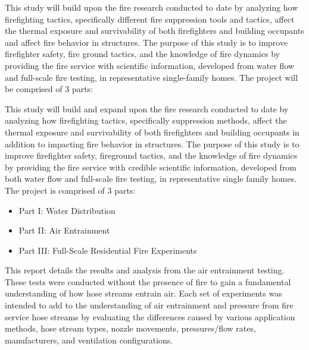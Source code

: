 \documentclass[12pt,oneside]{book}
\begin{document}
This study will build upon the fire research conducted to date by analyzing how firefighting tactics, specifically different fire suppression tools and tactics, affect the thermal exposure and survivability of both firefighters and building occupants and affect fire behavior in structures. The purpose of this study is to improve firefighter safety, fire ground tactics, and the knowledge of fire dynamics by providing the fire service with scientific information, developed from water flow and full-scale fire testing, in representative single-family homes. The project will be comprised of 3 parts:


\vspace*{\baselineskip}

This study will build and expand upon the fire research conducted to date by analyzing how firefighting tactics, specifically suppression methods, affect the thermal exposure and survivability of both firefighters and building occupants in addition to impacting fire behavior in structures. The purpose of this study is to improve firefighter safety, fireground tactics, and the knowledge of fire dynamics by providing the fire service with credible scientific information, developed from both water flow and full-scale fire testing, in representative single family homes. The project is comprised of 3 parts:
\vspace*{\baselineskip}
\begin{itemize}
	\item Part I:  Water Distribution
	\item Part II: Air Entrainment
	\item Part III: Full-Scale Residential Fire Experiments
	\end{itemize}
\vspace*{\baselineskip}

This report details the results and analysis from the air entrainment testing. These tests were conducted without the presence of fire to gain a fundamental understanding of how hose streams entrain air. Each set of experiments was intended to add to the understanding of air entrainment and pressure from fire service hose streams by evaluating the differences caused by various application methods, hose stream types, nozzle movements, pressures/flow rates, manufacturers, and ventilation configurations.



\end{document}
